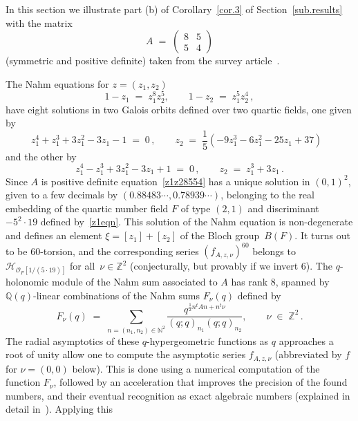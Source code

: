 \documentclass[12pt,reqno]{amsart}
\theoremstyle{definition}
\def\BN{\mathbb N}
\def\BZ{\mathbb Z}
\def\BQ{\mathbb Q}
\def\calH{\mathcal H}
\def\be{\begin{equation}}
\def\ee{\end{equation}}
\def\calO{\mathcal{O}}
\def\={\;=\;}
\def\inn{\;\in\;}
\def\Phitof{f}
\begin{document}
In this section we illustrate part (b) of Corollary~\ref{cor.3} of
Section~\ref{sub.results} with the matrix
\be
\label{A2ex}
A\=\begin{pmatrix} 8 & 5 \\ 5 & 4 \end{pmatrix}
\ee
(symmetric and positive definite) taken from the survey article~\cite{Zagier:dilog}.

The Nahm equations for $z=(z_1,z_2)$
\be
\label{z1z28554}
1-z_1 \= z_1^8 z_2^5, \qquad 1-z_2 \= z_1^5 z_2^4\,,
\ee
have eight solutions in two Galois orbits defined over two quartic fields, one given
by
\be
\label{z1eqn}
  z_1^4 + z_1^3 + 3z_1^2 - 3z_1 - 1\=0\,,\qquad z_2\=\frac{1}{5}(-9z_1^3 - 6z_1^2 - 25z_1 + 37)\,\phantom{,}
\ee
and the other by
\be
  z_1^4 - z_1^3 + 3z_1^2 - 3z_1 + 1\=0\,,\qquad z_2\=z_1^3 + 3z_1\,.
\ee
Since $A$ is positive definite equation~\eqref{z1z28554} has a unique solution in
$(0,1)^2$, given to a few decimals by $(0.88483\cdots,0.78939\cdots)$, belonging
to the real embedding of the quartic number field $F$ of type $(2,1)$ and discriminant
$-5^2 \cdot 19$ defined by~\eqref{z1eqn}.
This solution of the Nahm equation is non-degenerate and defines an element
$\xi=[z_1]+[z_2]$ of the Bloch group~$B(F)$. It turns out to be 60-torsion,
and the corresponding series $(\Phitof_{A,z,\nu})^{60}$ belongs to
$\calH_{\calO_F[1/(5 \cdot 19)]}$ for all~$\nu \in \BZ^2$ (conjecturally, but provably
if we invert $6$). The $q$-holonomic module of the Nahm sum associated to $A$
has rank 8, spanned by $\BQ(q)$-linear combinations of the Nahm sums $F_\nu(q)$
defined by
\be
\label{nahm8554}
F_\nu(q) \= \sum_{n=(n_1,n_2) \in \BN^2} \frac{q^{\frac{1}{2} n^t A n + n^t \nu}}{
(q;q)_{n_1} (q;q)_{n_2}}, \qquad \nu \inn \BZ^2 \,.
\ee
The radial asymptotics of these $q$-hypergeometric functions as $q$ approaches
a root of unity allow one to compute the asymptotic series $\Phitof_{A,z,\nu}$
(abbreviated by $\Phitof$ for $\nu=(0,0)$ below). This
is done using a numerical computation of the function $F_\nu$, followed by an
acceleration that improves the precision of the found numbers, and their eventual
recognition as exact algebraic numbers (explained in detail
in~\cite{GZ:kashaev,GZ:qseries}). Applying this
\end{document}
